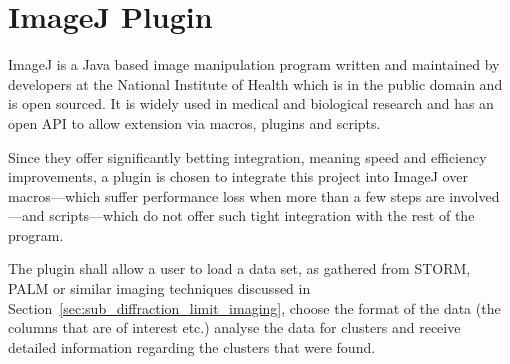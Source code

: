 
\part{ImageJ Plugin}
\label{part:imagej_plugin}

ImageJ is a Java based image manipulation program written and maintained by
developers at the National Institute of Health which is in the public domain
and is open sourced. It is widely used in medical and biological research and
has an open API to allow extension via macros, plugins and scripts.

Since they offer significantly betting integration, meaning speed and
efficiency improvements, a plugin is chosen to integrate this project into
ImageJ over macros---which suffer performance loss when more than a few steps
are involved---and scripts---which do not offer such tight integration with the
rest of the program.

The plugin shall allow a user to load a data set, as gathered from STORM, PALM
or similar imaging techniques discussed in
Section~\ref{sec:sub_diffraction_limit_imaging}, choose the format of the data
(the columns that are of interest etc.) analyse the data for clusters and
receive detailed information regarding the clusters that were found.

